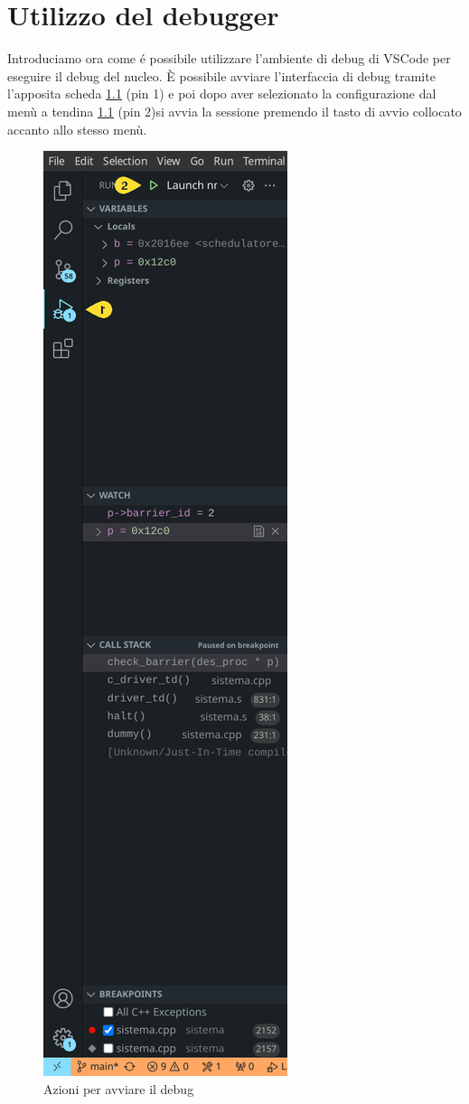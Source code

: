 \chapter{Utilizzo del debugger}
Introduciamo ora come é possibile utilizzare l'ambiente di debug di VSCode per eseguire il debug del nucleo. È possibile avviare l'interfaccia di debug tramite l'apposita scheda \ref{fig:startDebug} (pin 1) e poi dopo aver selezionato la configurazione   dal menù a tendina \ref{fig:startDebug} (pin 2)si avvia la sessione premendo il tasto di avvio collocato accanto allo stesso menù.  

\begin{figure}[H]
    \centering
    \includegraphics[height=0.3\pdfpageheight]{images/startDebug.png}
    \caption{Azioni per avviare il debug}
    \label{fig:startDebug}
\end{figure}

